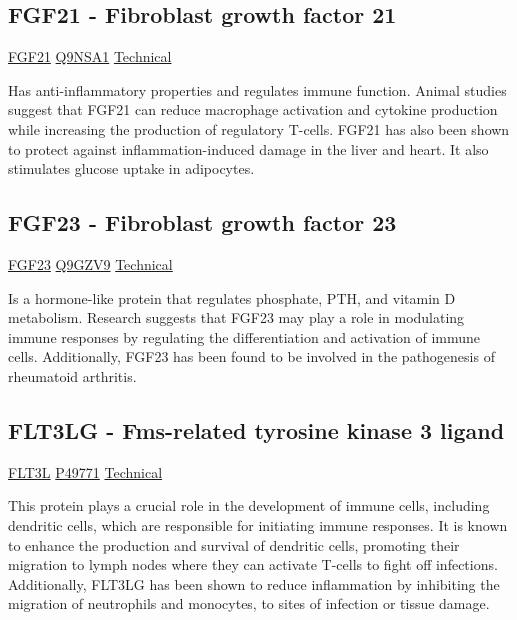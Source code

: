 \subsection{FGF21 - Fibroblast growth factor 21}

\href{https://en.wikipedia.org/wiki/FGF21}{FGF21}
\href{http://www.uniprot.org/uniprot/Q9NSA1}{Q9NSA1}
\href{https://olink.com/products-services/target/protein/?assayID=5051}{Technical}

Has anti-inflammatory properties and regulates immune function. Animal studies suggest that FGF21 can reduce macrophage activation and cytokine production while increasing the production of regulatory T-cells. FGF21 has also been shown to protect against inflammation-induced damage in the liver and heart. It also stimulates glucose uptake in adipocytes.

\subsection{FGF23 - Fibroblast growth factor 23}

\href{https://en.wikipedia.org/wiki/FGF23}{FGF23}
\href{http://www.uniprot.org/uniprot/Q9GZV9}{Q9GZV9}
\href{https://olink.com/products-services/target/protein/?assayID=5046}{Technical}

Is a hormone-like protein that regulates phosphate, PTH, and vitamin D metabolism. Research suggests that FGF23 may play a role in modulating immune responses by regulating the differentiation and activation of immune cells. Additionally, FGF23 has been found to be involved in the pathogenesis of rheumatoid arthritis.

\subsection{FLT3LG - Fms-related tyrosine kinase 3 ligand}

\href{https://en.wikipedia.org/wiki/FLT3LG}{FLT3L}
\href{http://www.uniprot.org/uniprot/P49771}{P49771}
\href{https://olink.com/products-services/target/protein/?assayID=5095}{Technical}

This protein plays a crucial role in the development of immune cells, including dendritic cells, which are responsible for initiating immune responses. It is known to enhance the production and survival of dendritic cells, promoting their migration to lymph nodes where they can activate T-cells to fight off infections. Additionally, FLT3LG has been shown to reduce inflammation by inhibiting the migration of neutrophils and monocytes, to sites of infection or tissue damage.

